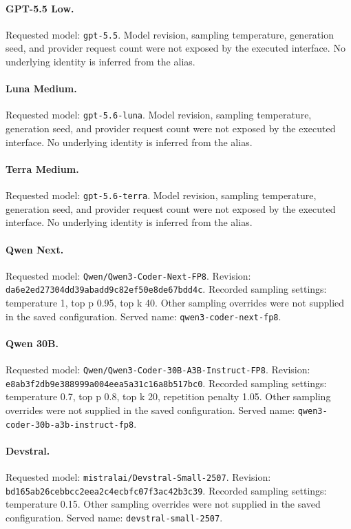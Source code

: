 \paragraph{GPT-5.5 Low.} Requested model: \nolinkurl{gpt-5.5}.
Model revision, sampling temperature, generation seed, and provider request count were not exposed by the executed interface. No underlying identity is inferred from the alias.
\paragraph{Luna Medium.} Requested model: \nolinkurl{gpt-5.6-luna}.
Model revision, sampling temperature, generation seed, and provider request count were not exposed by the executed interface. No underlying identity is inferred from the alias.
\paragraph{Terra Medium.} Requested model: \nolinkurl{gpt-5.6-terra}.
Model revision, sampling temperature, generation seed, and provider request count were not exposed by the executed interface. No underlying identity is inferred from the alias.
\paragraph{Qwen Next.} Requested model: \nolinkurl{Qwen/Qwen3-Coder-Next-FP8}.
Revision: {\footnotesize\texttt{da6e2ed27304dd39abadd9c82ef50e8de67bdd4c}}.
Recorded sampling settings: temperature 1, top p 0.95, top k 40. Other sampling overrides were not supplied in the saved configuration. Served name: \nolinkurl{qwen3-coder-next-fp8}.
\paragraph{Qwen 30B.} Requested model: \nolinkurl{Qwen/Qwen3-Coder-30B-A3B-Instruct-FP8}.
Revision: {\footnotesize\texttt{e8ab3f2db9e388999a004eea5a31c16a8b517bc0}}.
Recorded sampling settings: temperature 0.7, top p 0.8, top k 20, repetition penalty 1.05. Other sampling overrides were not supplied in the saved configuration. Served name: \nolinkurl{qwen3-coder-30b-a3b-instruct-fp8}.
\paragraph{Devstral.} Requested model: \nolinkurl{mistralai/Devstral-Small-2507}.
Revision: {\footnotesize\texttt{bd165ab26cebbcc2eea2c4ecbfc07f3ac42b3c39}}.
Recorded sampling settings: temperature 0.15. Other sampling overrides were not supplied in the saved configuration. Served name: \nolinkurl{devstral-small-2507}.
